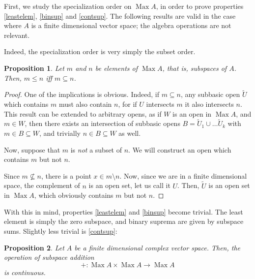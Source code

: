 \documentclass{article}
\theoremstyle{plain}
\newtheorem{prop}{Proposition}
\theoremstyle{nonumberplain}
\newtheorem{proof}{Proof}
\DeclareMathOperator{\Max}{Max}
\begin{document}
First, we study the specialization order on $\Max A$, in order to prove properties \ref{leastelem}, \ref{binsup} and \ref{contsup}. The following results are valid in the case where $A$ is a finite dimensional vector space; the algebra operations are not relevant.

Indeed, the specialization order is very simply the subset order.

\begin{prop}
Let $m$ and $n$ be elements of $\Max A$, that is, subspaces of $A$. Then, $m \leq n$ iff $m \subseteq n$.
\end{prop}

\begin{proof}
One of the implications is obvious. Indeed, if $m \subseteq n$, any subbasic open $\tilde U$ which contains $m$ must also contain $n$, for if $U$ intersects $m$ it also intersects $n$. This result can be extended to arbitrary opens, as if $W$ is an open in $\Max A$, and $m \in W$, then there exists an intersection of subbasic opens $B = \tilde U_1 \cup \dots \tilde U_k$ with $m \in B \subseteq W$, and trivially $n \in B \subseteq W$ as well.

Now, suppose that $m$ is \emph{not} a subset of $n$. We will construct an open which contains $m$ but not $n$.

Since $m \nsubseteq n$, there is a point $x \in m \setminus n$. Now, since we are in a finite dimensional space, the complement of $n$ is an open set, let us call it $U$. Then, $\tilde U$ is an open set in $\Max A$, which obviously contains $m$ but not $n$.
\end{proof}

With this in mind, properties \ref{leastelem} and \ref{binsup} become trivial. The least element is simply the zero subspace, and binary suprema are given by subspace sums. Slightly less trivial is \ref{contsup}:

\begin{prop}
Let $A$ be a finite dimensional complex vector space. Then, the operation of subspace addition
\[ + \colon \Max A \times \Max A \to \Max A\]
is continuous.
\end{prop}
\end{document}
